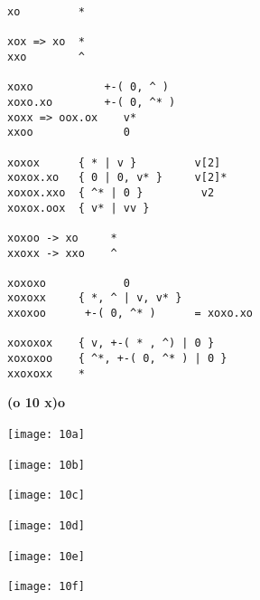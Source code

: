 \documentclass[12pt]{article}
\begin{document}
{\large\bf
\begin{verbatim}
xo         *

xox => xo  *
xxo        ^

xoxo           +-( 0, ^ ) 
xoxo.xo        +-( 0, ^* ) 
xoxx => oox.ox    v*
xxoo              0

xoxox      { * | v }         v[2]
xoxox.xo   { 0 | 0, v* }     v[2]*
xoxox.xxo  { ^* | 0 }         v2
xoxox.oox  { v* | vv }  

xoxoo -> xo     *
xxoxx -> xxo    ^

xoxoxo            0
xoxoxx     { *, ^ | v, v* }
xxoxoo      +-( 0, ^* )      = xoxo.xo

xoxoxox    { v, +-( * , ^) | 0 }
xoxoxoo    { ^*, +-( 0, ^* ) | 0 }
xxoxoxx    *
\end{verbatim}
}
\newpage
\hfill{\bf (o 10 x)o}\hfill\ 
\vfill

\hfill\texttt{[image: 10a]}\hfill~
\vfill

\hfill\texttt{[image: 10b]}\hfill~
\vfill

\hfill\texttt{[image: 10c]}\hfill~
\vfill

\hfill\texttt{[image: 10d]}\hfill~
\vfill

\hfill\texttt{[image: 10e]}\hfill~
\vfill

\hfill\texttt{[image: 10f]}\hfill~
\vfill\ 
\vfill\ 
\vfill\ 
\vfill\ 
\end{document}
